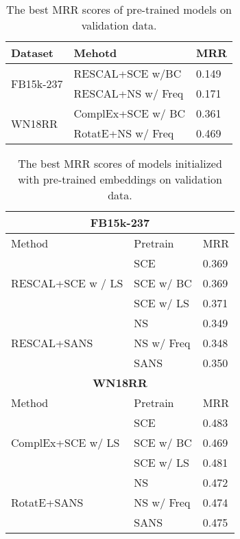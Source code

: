 \begin{table}[h]
\centering
\small
\begin{tabular}{lll}
\toprule
Dataset                    & Mehotd            & MRR   \\
\midrule
\multirow{2}{*}{FB15k-237} & RESCAL+SCE w/BC   & 0.149 \\
                           & RESCAL+NS w/ Freq & 0.171 \\
\midrule
\multirow{2}{*}{WN18RR}    & ComplEx+SCE w/ BC & 0.361 \\
                           & RotatE+NS w/ Freq & 0.469 \\
\bottomrule
\end{tabular}
\caption{The best MRR scores of pre-trained models on validation data.}
\label{tab:valid:pretraining}
\end{table}

\begin{table}[h]
\centering
\small
\begin{tabular}{lll}
\toprule
\multicolumn{3}{c}{\textbf{FB15k-237}}                           \\
\midrule
Method                             & Pretrain   & MRR   \\
\midrule
\multirow{3}{*}{RESCAL+SCE w / LS} & SCE        & 0.369 \\
                                   & SCE w/ BC  & 0.369 \\
                                   & SCE w/ LS  & 0.371 \\
\midrule
\multirow{3}{*}{RESCAL+SANS}       & NS         & 0.349 \\
                                   & NS w/ Freq & 0.348 \\
                                   & SANS       & 0.350 \\
\midrule
\multicolumn{3}{c}{\textbf{WN18RR}}                              \\
\midrule
Method                             & Pretrain   & MRR   \\
\midrule
\multirow{3}{*}{ComplEx+SCE w/ LS} & SCE        & 0.483 \\
                                   & SCE w/ BC  & 0.469 \\
                                   & SCE w/ LS  & 0.481 \\
\midrule
\multirow{3}{*}{RotatE+SANS}       & NS         & 0.472 \\
                                   & NS w/ Freq & 0.474 \\
                                   & SANS       & 0.475 \\
\bottomrule
\end{tabular}
\caption{The best MRR scores of models initialized with pre-trained embeddings on validation data.}
\label{tab:valid:pretrained}
\end{table}

